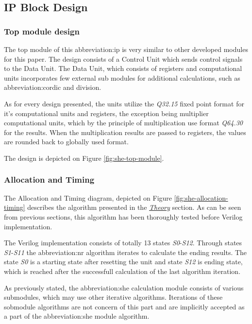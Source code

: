 \documentclass[a4paper, twoside, 11pt]{article}
\begin{document}
    \subsection{IP Block Design}
        \subsubsection{Top module design}
            The top module of this \gls{abbreviation:ip} is very similar to other developed modules for this paper. The design consists of a Control Unit which sends control signals to the Data Unit. The Data Unit, which consists of registers and computational units incorporates few external sub modules for additional calculations, such as \gls{abbreviation:cordic} and division.\par
            As for every design presented, the units utilize the \textit{Q32.15} fixed point format for it's computational units and registers, the exception being multiplier computational units, which by the principle of multiplication use format \textit{Q64.30} for the results. When the multiplication results are passed to registers, the values are rounded back to globally used format.\par
            The design is depicted on Figure \ref{fig:she-top-module}.



        \subsubsection{Allocation and Timing}\label{sh:allocation-and-timing}
            The Allocation and Timing diagram, depicted on Figure \ref{fig:she-allocation-timing} describes the algorithm presented in the \hyperref[subsec:she-theory]{\textit{Theory}} section. As can be seen from previous sections, this algorithm has been thoroughly tested before Verilog implementation.\par
            The Verilog implementation consists of totally 13 states \textit{S0}-\textit{S12}. Through states \textit{S1}-\textit{S11} the \gls{abbreviation:nr} algorithm iterates to calculate the ending results. The state \textit{S0} is a starting state after resetting the unit and state \textit{S12} is ending state, which is reached after the successfull calculation of the last algorithm iteration.\par
            As previously stated, the \gls{abbreviation:she} calculation module consists of various submodules, which may use other iterative algorithms. Iterations of these sobmodule algorithms are not concern of this part and are implicitly accepted as a part of the \gls{abbreviation:she} module algorithm.
\end{document}
